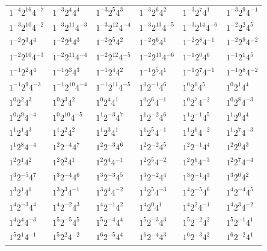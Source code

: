 \documentclass[12pt]{amsart}
\numberwithin{equation}{section}
\theoremstyle{plain}
\theoremstyle{definition}
\theoremstyle{remark}
\begin{document}
\begin{longtable}{llllll}
$1^{-4}2^{16}4^{-7}$ & $1^{-3}2^{4}4^{4}$ & $1^{-3}2^{5}4^{3}$ & $1^{-3}2^{6}4^{2}$ & $1^{-3}2^{7}4^{1}$ & $1^{-3}2^{9}4^{-1}$\\
$1^{-3}2^{10}4^{-2}$ & $1^{-3}2^{11}4^{-3}$ & $1^{-3}2^{12}4^{-4}$ & $1^{-3}2^{13}4^{-5}$ & $1^{-3}2^{14}4^{-6}$ & $1^{-2}2^{2}4^{5}$\\
$1^{-2}2^{3}4^{4}$ & $1^{-2}2^{4}4^{3}$ & $1^{-2}2^{5}4^{2}$ & $1^{-2}2^{6}4^{1}$ & $1^{-2}2^{8}4^{-1}$ & $1^{-2}2^{9}4^{-2}$\\
$1^{-2}2^{10}4^{-3}$ & $1^{-2}2^{11}4^{-4}$ & $1^{-2}2^{12}4^{-5}$ & $1^{-2}2^{13}4^{-6}$ & $1^{-1}2^{0}4^{6}$ & $1^{-1}2^{1}4^{5}$\\
$1^{-1}2^{2}4^{4}$ & $1^{-1}2^{3}4^{3}$ & $1^{-1}2^{4}4^{2}$ & $1^{-1}2^{5}4^{1}$ & $1^{-1}2^{7}4^{-1}$ & $1^{-1}2^{8}4^{-2}$\\
$1^{-1}2^{9}4^{-3}$ & $1^{-1}2^{10}4^{-4}$ & $1^{-1}2^{11}4^{-5}$ & $1^{0}2^{-1}4^{6}$ & $1^{0}2^{0}4^{5}$ & $1^{0}2^{1}4^{4}$\\
$1^{0}2^{2}4^{3}$ & $1^{0}2^{3}4^{2}$ & $1^{0}2^{4}4^{1}$ & $1^{0}2^{6}4^{-1}$ & $1^{0}2^{7}4^{-2}$ & $1^{0}2^{8}4^{-3}$\\
$1^{0}2^{9}4^{-4}$ & $1^{0}2^{10}4^{-5}$ & $1^{1}2^{-3}4^{7}$ & $1^{1}2^{-2}4^{6}$ & $1^{1}2^{-1}4^{5}$ & $1^{1}2^{0}4^{4}$\\
$1^{1}2^{1}4^{3}$ & $1^{1}2^{2}4^{2}$ & $1^{1}2^{3}4^{1}$ & $1^{1}2^{5}4^{-1}$ & $1^{1}2^{6}4^{-2}$ & $1^{1}2^{7}4^{-3}$\\
$1^{1}2^{8}4^{-4}$ & $1^{2}2^{-4}4^{7}$ & $1^{2}2^{-3}4^{6}$ & $1^{2}2^{-2}4^{5}$ & $1^{2}2^{-1}4^{4}$ & $1^{2}2^{0}4^{3}$\\
$1^{2}2^{1}4^{2}$ & $1^{2}2^{2}4^{1}$ & $1^{2}2^{4}4^{-1}$ & $1^{2}2^{5}4^{-2}$ & $1^{2}2^{6}4^{-3}$ & $1^{2}2^{7}4^{-4}$\\
$1^{3}2^{-5}4^{7}$ & $1^{3}2^{-4}4^{6}$ & $1^{3}2^{-3}4^{5}$ & $1^{3}2^{-2}4^{4}$ & $1^{3}2^{-1}4^{3}$ & $1^{3}2^{0}4^{2}$\\
$1^{3}2^{1}4^{1}$ & $1^{3}2^{3}4^{-1}$ & $1^{3}2^{4}4^{-2}$ & $1^{3}2^{5}4^{-3}$ & $1^{4}2^{-5}4^{6}$ & $1^{4}2^{-4}4^{5}$\\
$1^{4}2^{-3}4^{4}$ & $1^{4}2^{-2}4^{3}$ & $1^{4}2^{-1}4^{2}$ & $1^{4}2^{0}4^{1}$ & $1^{4}2^{2}4^{-1}$ & $1^{4}2^{3}4^{-2}$\\
$1^{4}2^{4}4^{-3}$ & $1^{5}2^{-5}4^{5}$ & $1^{5}2^{-4}4^{4}$ & $1^{5}2^{-3}4^{3}$ & $1^{5}2^{-2}4^{2}$ & $1^{5}2^{-1}4^{1}$\\
$1^{5}2^{1}4^{-1}$ & $1^{5}2^{2}4^{-2}$ & $1^{6}2^{-5}4^{4}$ & $1^{6}2^{-4}4^{3}$ & $1^{6}2^{-3}4^{2}$ & $1^{6}2^{-2}4^{1}$\\

\end{longtable}
\end{document}
